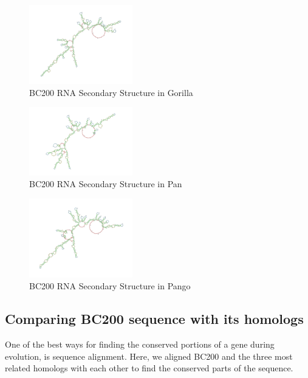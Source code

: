 \documentclass[conference]{IEEEtran}
\begin{document}
\begin{figure}
  \centering
  \includegraphics[width=0.4\textwidth]{figs/rnagorilla.png}
  \caption{BC200 RNA Secondary Structure in Gorilla}
\end{figure}
\begin{figure}
  \centering
  \includegraphics[width=0.4\textwidth]{figs/rnapan.png}
  \caption{BC200 RNA Secondary Structure in Pan}
\end{figure}
\begin{figure}
  \centering
  \includegraphics[width=0.4\textwidth]{figs/rnapango.png}
  \caption{BC200 RNA Secondary Structure in Pango}
\end{figure}

\subsection{Comparing BC200 sequence with its homologs}

One of the best ways for finding the conserved portions of a gene during evolution, is sequence alignment. Here, we aligned BC200 and the three most related homologs with each other to find the conserved parts of the sequence.
\end{document}
